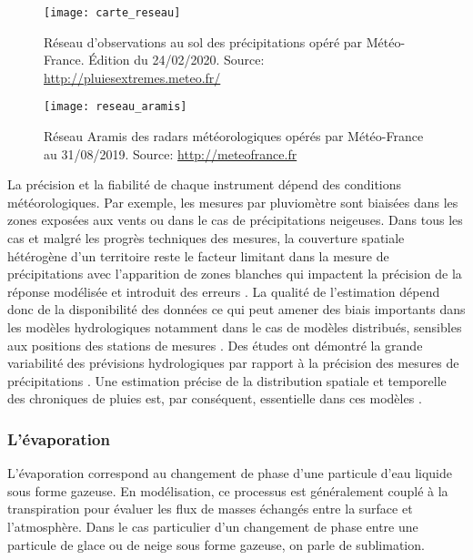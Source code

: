 \begin{figure}[h!]
    \begin{minipage}[c]{.46\textwidth}
        \centering
        \texttt{[image: carte\_reseau]}
        \caption{Réseau d'observations au sol des précipitations opéré par Météo-France. \'Edition du 24/02/2020. Source: \url{http://pluiesextremes.meteo.fr/}}
        \label{pluvio}
     \end{minipage}
     \hfill%
    \begin{minipage}[c]{.46\textwidth}
     \texttt{[image: reseau\_aramis]}
     \caption{Réseau Aramis des radars météorologiques opérés par Météo-France au 31/08/2019. Source: \url{http://meteofrance.fr}}  
     \label{systeme_mesures}   
    \end{minipage}
\end{figure}

\noindent La précision et la fiabilité de chaque instrument dépend des conditions météorologiques. Par exemple, les mesures par pluviomètre sont biaisées dans les zones exposées aux vents ou dans le cas de précipitations neigeuses. Dans tous les cas et malgré les progrès techniques des mesures, la couverture spatiale hétérogène d'un territoire reste le facteur limitant dans la mesure de précipitations avec l'apparition de zones blanches \citep{maddox2002} qui impactent la précision de la réponse modélisée et introduit des erreurs \citep{segond2007}. La qualité de l’estimation dépend donc de la disponibilité des données \citep{ly2013} ce qui peut amener des biais importants dans les modèles hydrologiques notamment dans le cas de modèles distribués, sensibles aux positions des stations de mesures \citep{bell2000, nicotina2008}. Des études ont démontré la grande variabilité des prévisions hydrologiques par rapport à la précision des mesures de précipitations \citep{kavetski2006}. Une estimation précise de la distribution spatiale et temporelle des chroniques de pluies est, par conséquent, essentielle dans ces modèles \citep{jatho2010,mercogliano2013}. 

\subsubsection{{\selectfont L'évaporation}}

L'évaporation correspond au changement de phase d'une particule d'eau liquide sous forme gazeuse. En modélisation, ce processus est généralement couplé à la transpiration pour évaluer les flux de masses échangés entre la surface et l'atmosphère. Dans le cas particulier d'un changement de phase entre une particule de glace ou de neige sous forme gazeuse, on parle de sublimation.\\

